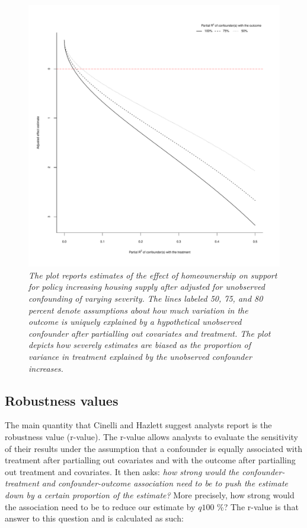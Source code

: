 \documentclass[hidelinks,11pt]{article}
\begin{document}
\begin{figure}
  \includegraphics[width=\linewidth]{../plots/hankinson2.pdf}
  \caption{\emph{The plot reports estimates of the effect of homeownership on support for policy increasing housing supply after adjusted for unobserved confounding of varying severity. The lines labeled 50, 75, and 80 percent denote assumptions about how much variation in the outcome is uniquely explained by a hypothetical unobserved confounder after partialling out covariates and treatment. The plot depicts how severely estimates are biased as the proportion of variance in treatment explained by the unobserved confounder increases.}}
  \label{hankinson2}
\end{figure}



\subsection{Robustness values}

The main quantity that Cinelli and Hazlett suggest analysts report is the robustness value (r-value). The  r-value allows analysts to evaluate the sensitivity of their results under the assumption that a confounder is equally associated with treatment after partialling out covariates and with the outcome after partialling out treatment and covariates. It then asks: \emph{how strong would the confounder-treatment and confounder-outcome association need to be to push the estimate down by a certain proportion of the estimate?} More precisely, how strong would the association need to be to reduce our estimate by $q100$ \%? The r-value is that answer to this question and is calculated as such:
\end{document}
